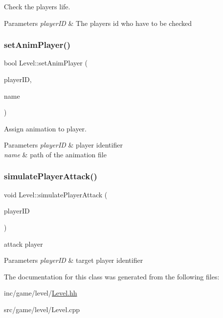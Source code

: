 Check the player\textquotesingle{}s life. 


\begin{DoxyParams}{Parameters}
{\em player\+ID} & The player\textquotesingle{}s id who have to be checked \\
\hline
\end{DoxyParams}
\mbox{\label{classLevel_ad3c2dcaeba48a4da763c1b9b6d23d248}} 
\subsubsection{\texorpdfstring{set\+Anim\+Player()}{setAnimPlayer()}}
{\footnotesize\ttfamily bool Level\+::set\+Anim\+Player (\begin{DoxyParamCaption}\item[{const Unsigned\+Int \&}]{player\+ID,  }\item[{String}]{name }\end{DoxyParamCaption})}



Assign animation to player. 


\begin{DoxyParams}{Parameters}
{\em player\+ID} & player identifier \\
\hline
{\em name} & path of the animation file \\
\hline
\end{DoxyParams}
\mbox{\label{classLevel_ad31dd05f4278c778da85e79a0fd04430}} 
\subsubsection{\texorpdfstring{simulate\+Player\+Attack()}{simulatePlayerAttack()}}
{\footnotesize\ttfamily void Level\+::simulate\+Player\+Attack (\begin{DoxyParamCaption}\item[{const Unsigned\+Int \&}]{player\+ID }\end{DoxyParamCaption})}



attack player 


\begin{DoxyParams}{Parameters}
{\em player\+ID} & target player identifier \\
\hline
\end{DoxyParams}


The documentation for this class was generated from the following files\+:\begin{DoxyCompactItemize}
\item 
inc/game/level/\hyperlink{Level_8hh}{Level.\+hh}\item 
src/game/level/Level.\+cpp\end{DoxyCompactItemize}
